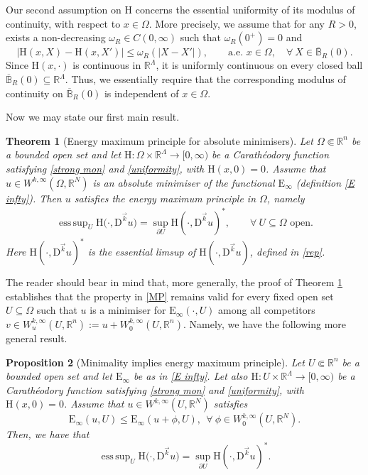 \documentclass[a4paper,11pt]{article}
\numberwithin{equation}{section}
\newtheorem{Theorem}{Theorem}[section]
\newtheorem{Proposition}[Theorem]{Proposition}
\newcommand{\numberset}{\mathbb}
\newcommand{\Om}{\Omega}
\newcommand{\R}{\numberset{R}}
\newcommand{\rom}{\mathrm}
\DeclareMathOperator*{\esssup}{ess\,sup}
\theoremstyle{definition}
\begin{document}
Our second assumption on $\rom{H}$ concerns the essential uniformity of its modulus of continuity, with respect to $x\in\Omega$. More precisely, we assume that for any $R>0$, exists a non-decreasing $\omega_R\in C(0,\infty)$ such that $\omega_R(0^+)=0$ and
\begin{equation}\label{uniformity}
\big|\rom{H}(x,X)-\rom{H}(x,X')\big| \leq \omega_R(|X-X'|),\qquad \text{a.e. } x\in\Omega,\quad\forall\  X\in \overline{\mathbb B}_R(0).
\end{equation}
Since $\rom{H}(x,\cdot)$ is continuous in $\R^\Lambda$, it is uniformly continuous on every closed ball $\overline{\mathbb B}_R(0)\subseteq\R^\Lambda$. Thus, we essentially require that the corresponding modulus of continuity on $\overline{\mathbb B}_R(0)$ is independent of $x\in\Omega$. 

\smallskip

Now we may state our first main result.

\begin{Theorem}[Energy maximum principle for absolute minimisers]\label{thm1}
Let $\Om\Subset\R^n$ be a bounded open set and let $\rom{H}:\Om\times\R^\Lambda\longrightarrow [0,\infty)$ be a Carathéodory function satisfying \eqref{strong mon} and \eqref{uniformity}, with $\rom{H}(x,0)=0$. Assume that $u\in W^{k,\infty}(\Om,\R^N)$ is an absolute minimiser of the functional $\mathrm E_\infty$ (definition \eqref{E infty}). Then $u$ satisfies the energy maximum principle in $\Om$, namely
\begin{align}\label{MP}
\esssup_U \rom{H}\big (\cdot,\mathrm D^{\vec{k}}u \big)=\sup_{\partial U}\rom{H}(\cdot,\mathrm D ^{\vec{k}}u)^*,\qquad\forall\  U\subseteq\Om \mbox{ open}.
\end{align}
Here $\rom{H}(\cdot,\mathrm D ^{\vec{k}}u)^*$ is the essential limsup of $\rom{H}(\cdot,\mathrm D ^{\vec{k}}u)$, defined in \eqref{rep}.
\end{Theorem}
The reader should bear in mind that, more generally, the proof of Theorem \ref{thm1} establishes that the property in \eqref{MP} remains valid for every fixed open set $U\subseteq\Om$ such that $u$ is a minimiser for $\rom E_\infty(\cdot,U)$ among all competitors $v\in W_u^{k,\infty}(U,\R^n):=u+W_0^{k,\infty}(U,\R^n)$. Namely, we have the following more general result.
\begin{Proposition}[Minimality implies energy maximum principle]
Let $U\Subset\R^n$ be a bounded open set and let $\rom E_\infty$ be as in \eqref{E infty}. Let also $\rom{H}:U\times\R^\Lambda\longrightarrow [0,\infty)$ be a Carathéodory function satisfying \eqref{strong mon} and \eqref{uniformity}, with $\rom{H}(x,0)=0$. Assume that $u\in W^{k,\infty}(U,\R^N)$ satisfies
$$
\mathrm E_\infty(u,U)\leq \mathrm E_\infty (u+\phi,U),\ \ \forall\ 
 \phi\in W^{k,\infty}_0(U,\R^N).
$$ 
Then, we have that
$$
\esssup_U \rom{H}\big (\cdot,\mathrm D^{\vec{k}}u \big)=\sup_{\partial U}\rom{H}(\cdot,\mathrm D ^{\vec{k}}u)^*.
$$
\end{Proposition}
\end{document}
